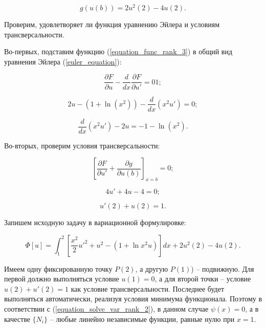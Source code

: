 \begin{displaymath}
	g(u(b)) = 2u^2(2) - 4u(2).
\end{displaymath}

\noindent Проверим, удовлетворяет ли функция уравнению Эйлера и условиям трансверсальности.

Во-первых, подставим функцию (\ref{equation_func_rank_3}) в общий вид уравнения Эйлера (\ref{euler_equation}):

\begin{displaymath}
	\frac{\partial F}{\partial u} - \frac{d}{dx} \frac{\partial F}{\partial u'} = 01;
\end{displaymath}

\begin{displaymath}
	2u - (1 + \ln(x^2)) - \frac{d}{dx}(x^2 u') = 0;
\end{displaymath}

\begin{displaymath}
	\frac{d}{dx}(x^2 u') - 2u = -1 - \ln(x^2).
\end{displaymath}

Во-вторых, проверим условия трансверсальности:

\begin{displaymath}
	\left[ \frac{\partial F}{\partial u'} + \frac{\partial g}{\partial u(b)} \right] _{x=b} = 0;
\end{displaymath}

\begin{displaymath}
	4u' + 4u - 4 = 0;
\end{displaymath}

\begin{displaymath}
	u'(2) + u(2) = 1.
\end{displaymath}

Запишем исходную задачу в вариационной формулировке:

\begin{equation}\label{equation_functional_rank_3}
	\Phi[u] = \int_{1}^{2} \left[ \frac{x^2}{2}u'^2 + u^2 - (1 + \ln{x^2}u) \right] dx + 2u^2(2) - 4u(2).
\end{equation}

Имеем одну фиксированную точку $P(2)$, а другую $P(1)$) -- подвижную. Для первой должно выполняться условие $u(1) = 0$, а для второй точки -- условие $u(2) + u'(2) = 1$ как условие трансверсальности. Последнее будет выполняться автоматически, реализуя условия минимума функционала. Поэтому в соответствии с (\ref{equation_solve_var_rank_2}), в данном случае $\psi(x) = 0$, а в качестве $\lbrace N_{i} \rbrace$ -- любые линейно независимые функции, равные нулю при $x = 1$.

